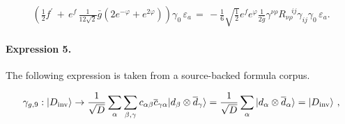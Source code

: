 \documentclass[11pt]{article}
\begin{document}
\begin{align*} \left(\frac{1}{2}f^{\prime}\,+\, e^f\,\frac{1}{12\sqrt{2}}\bar{g}\left(2e^{-\varphi}+e^{2\varphi}\right)\right)\gamma_0\,\varepsilon_a \,=\,-\frac{1}{6} \sqrt{\frac{1}{2}}e^fe^{\varphi}\frac{1}{2\bar{g}}\gamma^{\nu \rho}R_{\nu \rho}^{\;\;\;ij}\gamma_{ij}\gamma_0\,\varepsilon_a.\end{align*}

\paragraph{Expression 5.} The following expression is taken from a source-backed formula corpus.

\begin{align*}\gamma_{g,9}:|D_{\rm inv}\rangle \rightarrow {1\over\sqrt{D}} \sum_\alpha \sum_{\beta,\gamma} c_{\alpha\beta} {\overline c}_{\gamma\alpha} |d_\beta\otimes{\overline d}_\gamma \rangle={1\over \sqrt{D}} \sum_\alpha |d_\alpha\otimes{\overline d}_\alpha\rangle=|D_{\rm inv}\rangle~,\end{align*}
\end{document}
